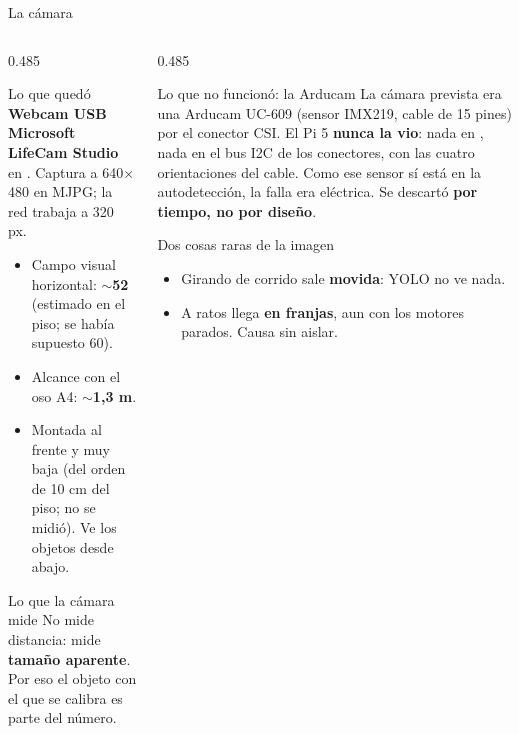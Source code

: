 \begin{frame}{La cámara}
  \begin{columns}[T,onlytextwidth]
    \begin{column}{0.485\textwidth}
      \begin{block}{Lo que quedó}
        \textbf{Webcam USB Microsoft LifeCam Studio} en .
        Captura a 640$\times$480 en MJPG; la red trabaja a 320 px.
        \begin{itemize}
          \item Campo visual horizontal: \textbf{$\sim$52\grad} (estimado en el
                piso; se había supuesto 60).
          \item Alcance con el oso A4: \textbf{$\sim$1,3 m}.
          \item Montada al frente y muy baja (del orden de 10 cm del piso;
                no se midió). Ve los objetos desde abajo.
        \end{itemize}
      \end{block}
      \begin{block}{Lo que la cámara mide}
        No mide distancia: mide \textbf{tamaño aparente}. Por eso el objeto
        con el que se calibra es parte del número.
      \end{block}
    \end{column}
    \begin{column}{0.485\textwidth}
      \begin{alertblock}{Lo que no funcionó: la Arducam}
        La cámara prevista era una Arducam UC-609 (sensor IMX219, cable de 15
        pines) por el conector CSI. El Pi 5 \textbf{nunca la vio}: nada en
        , nada en el bus I2C de los conectores, con las cuatro
        orientaciones del cable. Como ese sensor sí está en la autodetección,
        la falla era eléctrica. Se descartó \textbf{por tiempo, no por diseño}.
      \end{alertblock}
      \begin{block}{Dos cosas raras de la imagen}
        \begin{itemize}
          \item Girando de corrido sale \textbf{movida}: YOLO no ve nada.
          \item A ratos llega \textbf{en franjas}, aun con los motores
                parados. Causa sin aislar.
        \end{itemize}
      \end{block}
    \end{column}
  \end{columns}
\end{frame}

